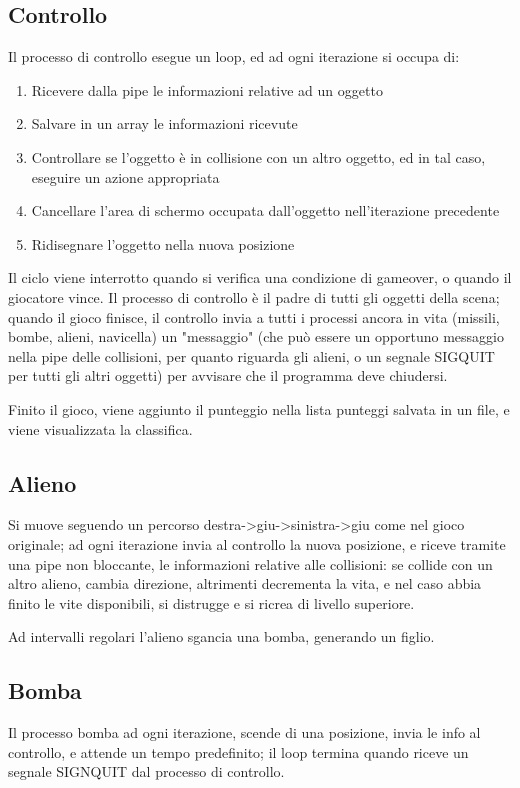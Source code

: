 \documentclass[a4paper,11pt]{report}
\begin{document}
\subsection{Controllo}
Il processo di controllo esegue un loop, ed ad ogni iterazione si occupa di:
\begin{enumerate}
  \item Ricevere dalla pipe le informazioni relative ad un oggetto
  \item Salvare in un array le informazioni ricevute
  \item Controllare se l'oggetto è in collisione con un altro oggetto, ed in tal caso, eseguire un azione appropriata
  \item Cancellare l'area di schermo occupata dall'oggetto nell'iterazione precedente
  \item Ridisegnare l'oggetto nella nuova posizione
\end{enumerate}
Il ciclo viene interrotto quando si verifica una condizione di gameover, o quando il giocatore vince.
Il processo di controllo è il padre di tutti gli oggetti della scena; quando il gioco finisce, il controllo
invia a tutti i processi ancora in vita (missili, bombe, alieni, navicella) un "messaggio" (che può essere
un opportuno messaggio nella pipe delle collisioni, per quanto riguarda gli alieni, o un segnale SIGQUIT per
tutti gli altri oggetti) per avvisare che il programma deve chiudersi.

Finito il gioco, viene aggiunto il punteggio nella lista punteggi salvata in un file, e viene visualizzata
la classifica.

\subsection{Alieno}
Si muove seguendo un percorso destra->giu->sinistra->giu come nel gioco originale;
ad ogni iterazione invia al controllo la nuova posizione, e riceve
tramite una pipe non bloccante, le informazioni relative alle collisioni:
se collide con un altro alieno, cambia direzione, altrimenti decrementa
la vita, e nel caso abbia finito le vite disponibili, si distrugge e si ricrea di livello superiore.

Ad intervalli regolari l'alieno sgancia una bomba, generando un figlio.

\subsection{Bomba}
Il processo bomba ad ogni iterazione, scende di una posizione, invia le info al controllo, e attende
un tempo predefinito; il loop termina quando riceve un segnale SIGNQUIT dal processo di controllo.
\end{document}
